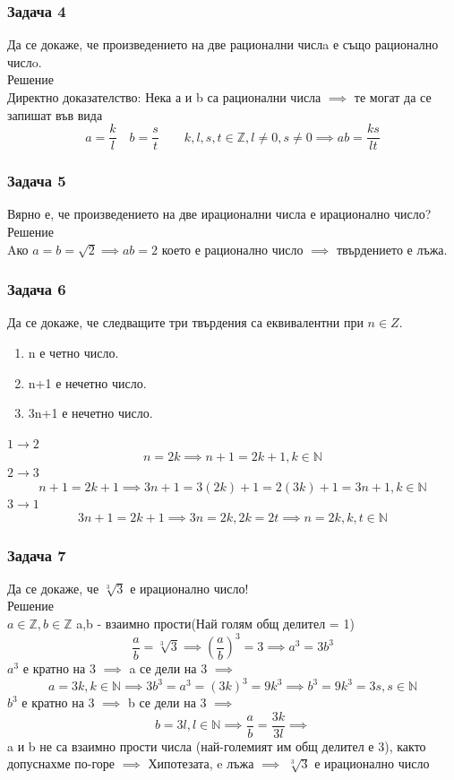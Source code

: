 \documentclass[fleqn, 12pt]{article}
\theoremstyle{definition}
\begin{document}
\subsubsection*{Задача 4}
Да се докаже, че произведението на две рационални числa е също рационално числo.\\
Решение \\
Директно доказателство: Нека а и b са рационални числа $\implies$ те могат да се запишат във вида 
$$a = \frac{k}{l} \quad b = \frac{s}{t} \qquad k,l,s,t \in \mathbb{Z}, l \neq 0, s \neq 0 \implies ab = \frac{ks}{lt}$$

\subsubsection*{Задача 5}
Вярно е, че произведението на две ирационални числа е ирационално число?\\
Решение\\
Aко $a = b = \sqrt{2} \implies ab = 2$ което е рационално число $\implies$ твърдението е лъжа.

\subsubsection*{Задача 6}
Да се докаже, че следващите три твърдения са еквивалентни при $n \in Z$.
\begin{enumerate}
\item n е четно число.
\item n+1 е нечетно число.
\item 3n+1 е нечетно число.
\end{enumerate}
$1 \to 2$\\
$$n = 2k \implies n+1 = 2k + 1 , k \in \mathbb{N}$$
$2 \to 3$\\
$$n+1 = 2k + 1 \implies 3n + 1 = 3(2k) + 1 = 2(3k) + 1 = 3n + 1, k \in \mathbb{N}$$
$3 \to 1$\\
$$3n + 1 = 2k + 1 \implies 3n = 2k, 2k = 2t \implies n = 2k , k,t \in \mathbb{N}$$

\subsubsection*{Задача 7}
Да се докаже, че $\sqrt[3]{3}$ е ирационално число! \\
Решение\\
$a \in \mathbb{Z}, b \in \mathbb{Z}$ a,b - взаимно прости(Най голям общ делител = 1)\\
$$\frac{a}{b} = \sqrt[3]{3} \implies \left( \frac{a}{b}\right)^3 = 3 \implies a^3 = 3b^3$$
$a^3$ е кратно на 3 $\implies$ a се дели на 3 $\implies$
$$a = 3k, k \in \mathbb{N} \implies 3b^3 = a^3 = (3k)^3 = 9k^3 \implies b^3 = 9k^3 = 3s, s \in \mathbb{N}$$
$b^3$ е кратно на 3 $\implies$ b се дели на 3 $\implies$
$$b = 3l, l \in \mathbb{N} \implies \frac{a}{b} = \frac{3k}{3l} \implies$$
a и b не са взаимно прости числа (най-големият им общ делител е 3), както допуснахме по-горе $\implies$ Хипотезата, e лъжа $\implies$ $\sqrt[3]{3}$ е ирационално число
\end{document}

